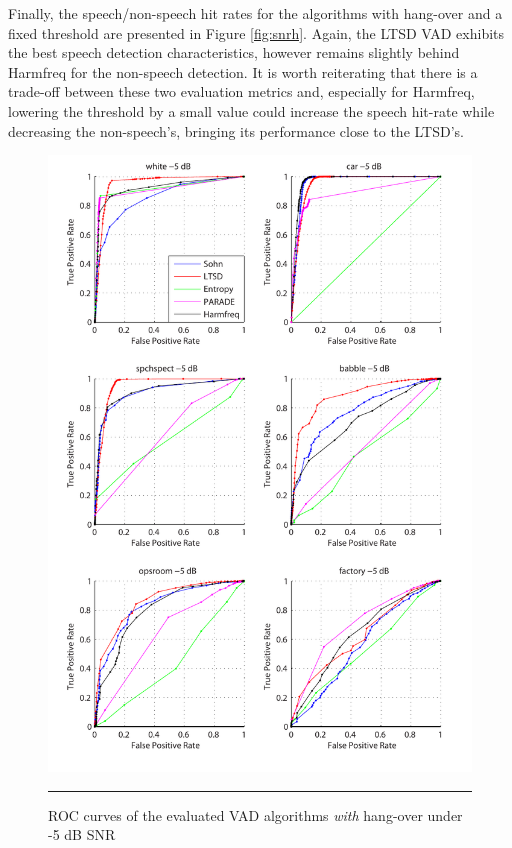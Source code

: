 Finally, the speech/non-speech hit rates for the algorithms with hang-over and a fixed threshold are presented in Figure \ref{fig:snrh}. Again, the LTSD VAD exhibits the best speech detection characteristics, however remains slightly behind Harmfreq for the non-speech detection. It is worth reiterating that there is a trade-off between these two evaluation metrics and, especially for Harmfreq, lowering the threshold by a small value could increase the speech hit-rate while decreasing the non-speech's, bringing its performance close to the LTSD's.

\begin{figure}[htbp]
	\centering
		\includegraphics[width=1.0\columnwidth]{Figures/Chapter4/-5dBh.pdf}
		\rule{37em}{0.5pt}
	\caption[ROC curves of the evaluated algorithms \emph{with} hang-over under -5 dB SNR]{ROC curves of the evaluated VAD algorithms \emph{with} hang-over under -5 dB SNR}
	\label{fig:-5dBh}
\end{figure}

